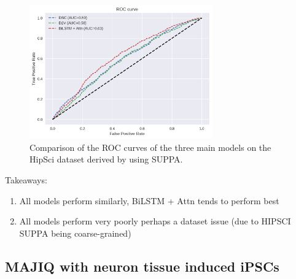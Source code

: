 \begin{figure}
	\centering\includegraphics[width=0.7\textwidth]{../visualizations/suppa_cross_model_roc_auc_comparison.png} 
	\caption[bla.]{Comparison of the ROC curves of the three main models on the HipSci dataset derived by using SUPPA. }
	\label{fig:suppa_auc}
\end{figure}

Takeaways:
\begin{enumerate}
	\item All models perform similarly, BiLSTM + Attn tends to perform best
	\item All models perform very poorly perhaps a dataset issue (due to HIPSCI SUPPA being coarse-grained)
\end{enumerate}

\subsection{MAJIQ with neuron tissue induced iPSCs} \label{sec:hipsci_majiq}
